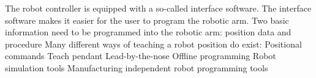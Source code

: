 The robot controller is equipped with a so-called interface software. The interface software makes it easier for the user to program the robotic arm.  
Two basic information need to be programmed into the robotic arm:
position data and 
procedure
Many different ways of teaching a robot position do exist:
Positional commands
Teach pendant
Lead-by-the-nose
Offline programming
Robot simulation tools
Manufacturing independent robot programming tools
